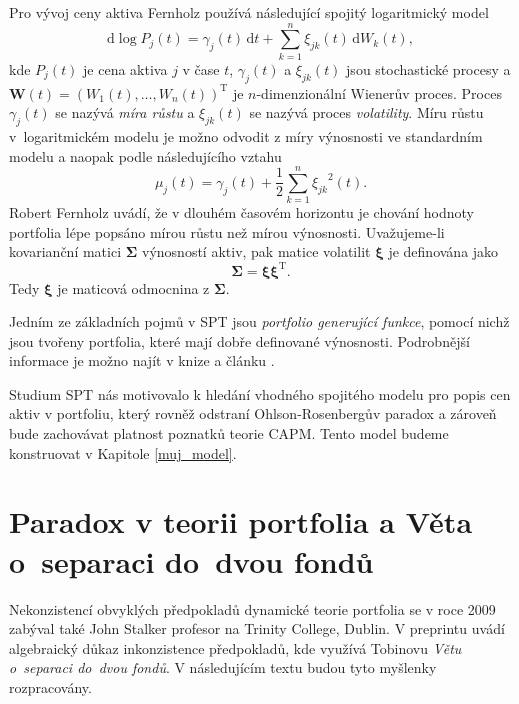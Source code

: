 \documentclass[a4paper,12pt]{report}
\theoremstyle{definition} \newtheorem{definice}[veta]{Definice}
\theoremstyle{remark}
\begin{document}
Pro vývoj ceny aktiva Fernholz používá následující spojitý logaritmický model
$$\mathrm{d}\log P_j(t)=\gamma_j(t)\,\mathrm{d}t+\sum_{k=1}^{n}\xi_{jk}(t)\,\mathrm{d}W_k(t),$$
kde $P_j(t)$ je cena aktiva $j$ v čase $t$, $\gamma_j(t)$ a $\xi_{jk}(t)$ jsou stochastické procesy a $\boldsymbol{W}(t)=(W_1(t),\dots,W_n(t))^\mathrm{T}$ je $n$-dimenzionální Wienerův proces. 
Proces $\gamma_j(t)$ se nazývá \textit{míra růstu} a $\xi_{jk}(t)$ se nazývá proces \textit{volatility}.
Míru růstu v~logaritmickém modelu je možno odvodit z míry výnosnosti ve standardním modelu a naopak podle následujícího vztahu
$$\mu_j(t)=\gamma_j(t)+\frac12\sum_{k=1}^{n}{\xi_{jk}}^2(t).$$
Robert Fernholz uvádí, že v dlouhém časovém horizontu je chování hodnoty portfolia lépe popsáno mírou růstu než mírou výnosnosti.
Uvažujeme-li kovarianční matici $\boldsymbol{\Sigma}$ výnosností aktiv, pak matice volatilit $\boldsymbol{\xi}$ je definována jako
$$\boldsymbol{\Sigma}=\boldsymbol{\xi}\boldsymbol{\xi}^\mathrm{T}.$$
Tedy $\boldsymbol{\xi}$ je maticová odmocnina z $\boldsymbol{\Sigma}$.

Jedním ze základních pojmů v SPT jsou \textit{portfolio generující funkce}, pomocí nichž jsou tvořeny portfolia, které mají dobře definované výnosnosti. 
Podrobnější informace je možno najít v knize \cite{fern} a článku \cite{kara}.

Studium SPT nás motivovalo k hledání vhodného spojitého modelu pro popis cen aktiv v portfoliu, který rovněž odstraní Ohlson-Rosenbergův paradox a zároveň bude zachovávat platnost poznatků teorie CAPM.
Tento model budeme konstruovat v Kapitole \ref{muj_model}.




\section{Paradox v teorii portfolia a Věta o~separaci do~dvou fondů} \label{john}
Nekonzistencí obvyklých předpokladů dynamické teorie portfolia se v roce 2009 zabýval také John Stalker profesor na Trinity College, Dublin. 
V preprintu \cite{john} uvádí algebraický důkaz inkonzistence předpokladů, kde využívá Tobinovu \textit{Větu o~separaci do~dvou fondů}. 
V následujícím textu budou tyto myšlenky rozpracovány.
\end{document}
